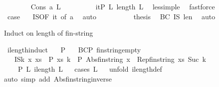 \begin{isabellebody}
\isanewline
\ \ \ \ \ \ \isamarkupfalse%
\ {\isacharparenleft}Cons\ a\ L{\isacharparenright}\isanewline
\ \ \ \ \ \ \isamarkupfalse%
\ \isamarkupfalse%
\ it{\isacharcolon}{\isachardoublequoteopen}P\ {\isacharparenleft}L{\isacharparenright}\ {\isacharparenleft}length\ L{\isacharparenright}{\isachardoublequoteclose}\ \isamarkupfalse%
\ less{\isacharunderscore}imp{\isacharunderscore}le\ \isamarkupfalse%
\ fastforce\isanewline
\ \ \ \ \ \ \isamarkupfalse%
\ \isamarkupfalse%
\ {\isacharquery}case\ \ \isamarkupfalse%
\ IS{\isacharbrackleft}OF\ it{\isacharcomma}\ of\ a{\isacharbrackright}\ \isamarkupfalse%
\ {\isacharparenleft}auto{\isacharparenright}\isanewline
\ \ \ \ \isamarkupfalse%
\isanewline
\ \ \isamarkupfalse%
\ \isamarkupfalse%
\ {\isacharquery}thesis\ \isamarkupfalse%
\ BC\ IS\ len\ \isamarkupfalse%
\ auto\isanewline
\ \ \isamarkupfalse%
%
\endisatagproof
{\isafoldproof}%
%
\isadelimproof
%
\endisadelimproof
%
\begin{isamarkuptext}%
Induct on length of fin-string%
\end{isamarkuptext}\isamarkuptrue%
\isamarkupfalse%
\ ilength{\isacharunderscore}induct{\isacharcolon}\isanewline
\ \ \ P\isanewline
\ \ \ BC{\isacharcolon}{\isachardoublequoteopen}P\ fin{\isacharunderscore}string{\isacharunderscore}empty\ {}{\isachardoublequoteclose}\isanewline
\ \ \ IS{\isacharcolon}{\isachardoublequoteopen}{\isacharparenleft}{\isasymAnd}k\ x\ xs{\isachardot}\ \ P\ xs\ k\ {\isasymLongrightarrow}\ P\ {\isacharparenleft}Abs{\isacharunderscore}fin{\isacharunderscore}string\ {\isacharparenleft}x\ {\isacharhash}\ Rep{\isacharunderscore}fin{\isacharunderscore}string\ xs{\isacharparenright}{\isacharparenright}\ {\isacharparenleft}Suc\ k{\isacharparenright}{\isacharparenright}{\isachardoublequoteclose}\isanewline
\ \ \ \ {\isachardoublequoteopen}P\ L\ {\isacharparenleft}ilength\ L{\isacharparenright}{\isachardoublequoteclose}\isanewline
%
\isadelimproof
\ \ %
\endisadelimproof
%
\isatagproof
{}\isamarkupfalse%
{\isacharparenleft}cases\ L{\isacharparenright}\isanewline
\ \ \isamarkupfalse%
{\isacharparenleft}unfold\ ilength{\isacharunderscore}def{\isacharparenright}\isanewline
\ \ \isamarkupfalse%
{\isacharparenleft}auto\ simp\ add{\isacharcolon}\ Abs{\isacharunderscore}fin{\isacharunderscore}string{\isacharunderscore}inverse{\isacharparenright}\isanewline

\end{isabellebody}
